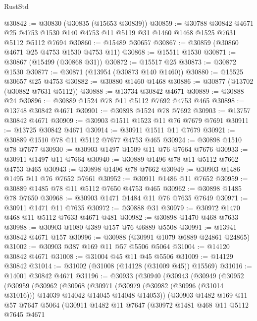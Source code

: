 \begin{lexlean}{RustStd}
\begin{coremodule}
@30842 := @30830 (@30835 (@15653 @30839))
@30859 := @30788
    @30842
    @4671
    @25
    @4753
    @1530
    @140
    @4753
    @11
    @5119
    @31
    @1460
    @1468
    @1525
    @7631
    @5112
    @5112
    @7694
@30860 := @15489 @30657
@30867 := @30859 (@30860 @4671 @25 @4753 @1530 @4753 @11)
@30868 := @15511 @1530
@30871 := @30867 (@15499 (@30868 @31))
@30872 := @15517 @25
@30873 := @30872 @1530
@30877 := @30871 (@13954 (@30873 @140 @1460))
@30880 := @15525 @30657 @25 @4753
@30882 := @30880 @1460 @1468
@30886 := @30877 (@13702 (@30882 @7631 @5112))
@30888 := @13734 @30842 @4671
@30889 := @30888 @24
@30896 := @30889 @1524 @78 @11 @5112 @7692 @4753 @465
@30898 := @13748 @30842 @4671
@30901 := @30898 @1524 @78 @7692
@30903 := @13757 @30842 @4671
@30909 := @30903 @1511 @1523 @11 @76 @7679 @7691
@30911 := @13725 @30842 @4671
@30914 := @30911 @1511 @11 @7679
@30921 := @30889 @1510 @78 @11 @5112 @7677 @4753 @465
@30924 := @30898 @1510 @78 @7677
@30930 := @30903 @1497 @1509 @11 @76 @7664 @7676
@30933 := @30911 @1497 @11 @7664
@30940 := @30889 @1496 @78 @11 @5112 @7662 @4753 @465
@30943 := @30898 @1496 @78 @7662
@30949 := @30903 @1486 @1495 @11 @76 @7652 @7661
@30952 := @30911 @1486 @11 @7652
@30959 := @30889 @1485 @78 @11 @5112 @7650 @4753 @465
@30962 := @30898 @1485 @78 @7650
@30968 := @30903 @1471 @1484 @11 @76 @7635 @7649
@30971 := @30911 @1471 @11 @7635
@30972 := @30888 @31
@30979 := @30972 @1470 @468 @11 @5112 @7633 @4671 @481
@30982 := @30898 @1470 @468 @7633
@30988 := @30903 @1080 @389 @157 @76 @6889 @5508
@30991 := @13941 @30842 @4671 @157
@30996 := @30988 (@30991 @1079 @6889 @24861 @24865)
@31002 := @30903 @387 @169 @11 @57 @5506 @5064
@31004 := @14120 @30842 @4671
@31008 := @31004 @45 @11 @45 @5506
@31009 := @14129 @30842
@31014 := @31002 (@31008 (@14128 (@31009 @45)) @15569)
@31016 := @14001 @30842 @4671
@31196 := @30933
    (@30940
      (@30943
        (@30949
          (@30952
            (@30959
              (@30962
                (@30968
                  (@30971
                    (@30979 (@30982 (@30996 (@31014 @31016))) @14039 @14042 @14045 @14048 @14053))
                  (@30903
                    @1482
                    @169
                    @11
                    @57
                    @7647
                    @5064
                    (@30911
                      @1482
                      @11
                      @7647
                      (@30972
                        @1481
                        @468
                        @11
                        @5112
                        @7645
                        @4671

\end{coremodule}
\end{lexlean}
